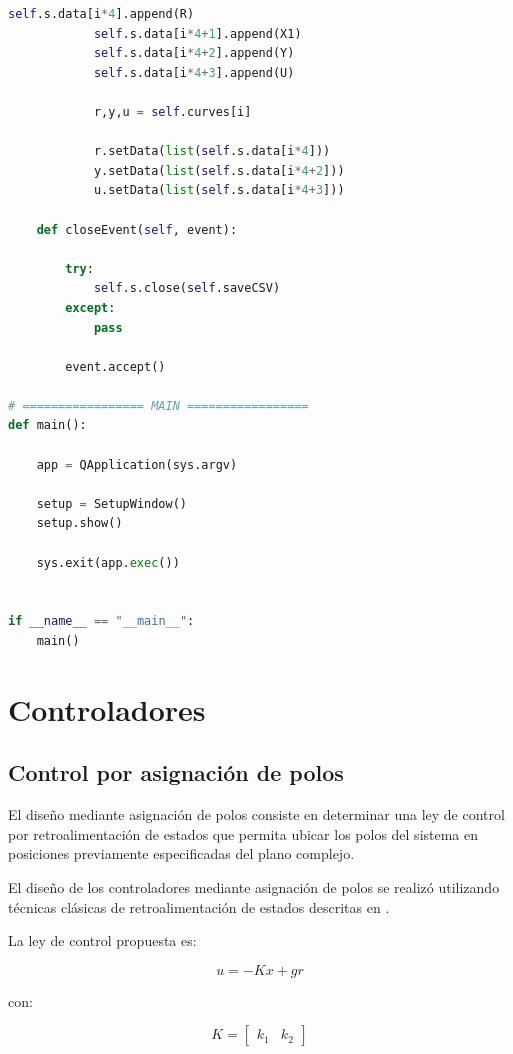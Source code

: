 \documentclass[12pt,letterpaper,twoside]{article}
\begin{document}
\begin{lstlisting}[language=Python]
            self.s.data[i*4].append(R)
            self.s.data[i*4+1].append(X1)
            self.s.data[i*4+2].append(Y)
            self.s.data[i*4+3].append(U)

            r,y,u = self.curves[i]

            r.setData(list(self.s.data[i*4]))
            y.setData(list(self.s.data[i*4+2]))
            u.setData(list(self.s.data[i*4+3]))

    def closeEvent(self, event):

        try:
            self.s.close(self.saveCSV)
        except:
            pass
    
        event.accept()
        
# ================= MAIN =================
def main():

    app = QApplication(sys.argv)

    setup = SetupWindow()
    setup.show()

    sys.exit(app.exec())


if __name__ == "__main__":
    main()
\end{lstlisting}

\section{Controladores}
\label{sec:Controladores}

\subsection{Control por asignación de polos}
\label{sec:AdPCtrl}

El diseño mediante asignación de polos consiste en determinar una ley de control por retroalimentación de estados que permita ubicar los polos del sistema en posiciones previamente especificadas del plano complejo.

El diseño de los controladores mediante asignación de polos se realizó utilizando técnicas clásicas de retroalimentación de estados descritas en \cite{Ogata,Franklin}.

La ley de control propuesta es:

\begin{equation}
u = -Kx + gr
\end{equation}

con:

\begin{equation}
K =
\begin{bmatrix}
k_1 & k_2
\end{bmatrix}
\end{equation}
\end{document}
